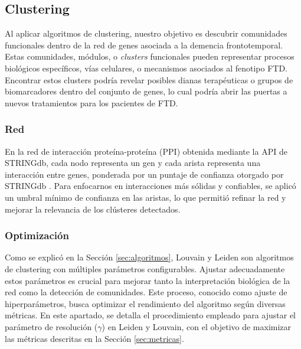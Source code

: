 \subsection{Clustering}

Al aplicar algoritmos de clustering, nuestro objetivo es descubrir comunidades funcionales dentro de la red de genes asociada a la demencia frontotemporal. Estas comunidades, módulos, o \textit{clusters} funcionales pueden representar procesos biológicos específicos, vías celulares, o mecanismos asociados al fenotipo FTD. Encontrar estos clusters podría revelar posibles dianas terapéuticas o grupos de biomarcadores dentro del conjunto de genes, lo cual podría abrir las puertas a nuevos tratamientos para los pacientes de FTD.

\subsubsection{Red}

En la red de interacción proteína-proteína (PPI) obtenida mediante la API de STRINGdb, cada nodo representa un gen y cada arista representa una interacción entre genes, ponderada por un puntaje de confianza otorgado por STRINGdb \cite{szklarczyk2023stringdb}. Para enfocarnos en interacciones más sólidas y confiables, se aplicó un umbral mínimo de confianza en las aristas, lo que permitió refinar la red y mejorar la relevancia de los clústeres detectados. 





\subsubsection{Optimización}

Como se explicó en la Sección \ref{sec:algoritmos}, Louvain y Leiden son algoritmos de clustering con múltiples parámetros configurables. Ajustar adecuadamente estos parámetros es crucial para mejorar tanto la interpretación biológica de la red como la detección de comunidades. Este proceso, conocido como ajuste de hiperparámetros, busca optimizar el rendimiento del algoritmo según diversas métricas. En este apartado, se detalla el procedimiento empleado para ajustar el parámetro de resolución (\(\gamma\)) en Leiden y Louvain, con el objetivo de maximizar las métricas descritas en la Sección \ref{sec:metricas}.

